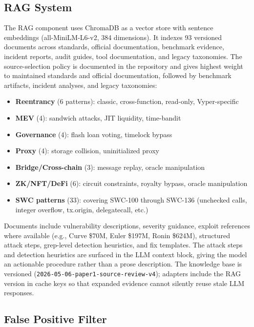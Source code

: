 \documentclass[conference]{IEEEtran}
\begin{document}
\subsection{RAG System}
\label{sec:rag}

The RAG component uses ChromaDB as a vector store with sentence embeddings (all-MiniLM-L6-v2, 384 dimensions). It indexes 93 versioned documents across standards, official documentation, benchmark evidence, incident reports, audit guides, tool documentation, and legacy taxonomies. The source-selection policy is documented in the repository and gives highest weight to maintained standards and official documentation, followed by benchmark artifacts, incident analyses, and legacy taxonomies:

\begin{itemize}
    \item \textbf{Reentrancy} (6 patterns): classic, cross-function, read-only, Vyper-specific
    \item \textbf{MEV} (4): sandwich attacks, JIT liquidity, time-bandit
    \item \textbf{Governance} (4): flash loan voting, timelock bypass
    \item \textbf{Proxy} (4): storage collision, uninitialized proxy
    \item \textbf{Bridge/Cross-chain} (3): message replay, oracle manipulation
    \item \textbf{ZK/NFT/DeFi} (6): circuit constraints, royalty bypass, oracle manipulation
    \item \textbf{SWC patterns} (33): covering SWC-100 through SWC-136 (unchecked calls, integer overflow, tx.origin, delegatecall, etc.)
\end{itemize}

Documents include vulnerability descriptions, severity guidance, exploit references where available (e.g., Curve \$70M, Euler \$197M, Ronin \$624M), structured attack steps, grep-level detection heuristics, and fix templates. The attack steps and detection heuristics are surfaced in the LLM context block, giving the model an actionable procedure rather than a prose description. The knowledge base is versioned (\texttt{2026-05-06-paper1-source-review-v4}); adapters include the RAG version in cache keys so that expanded evidence cannot silently reuse stale LLM responses.

\subsection{False Positive Filter}
\end{document}
